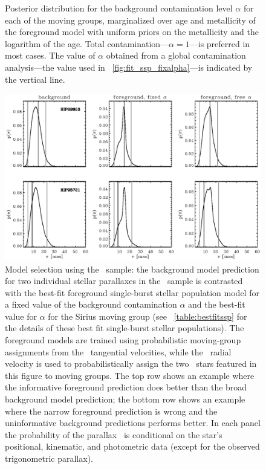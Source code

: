 \begin{figure}
\begin{center}
\caption[Posterior distribution for the background contamination level
$\alpha$ for each of the moving groups, marginalized over age and
metallicity of the foreground model]{Posterior distribution for the
background contamination level $\alpha$ for each of the moving groups,
marginalized over age and metallicity of the foreground model with
uniform priors on the metallicity and the logarithm of the age. Total
contamination---$\alpha=1$---is preferred in most cases. The value of
$\alpha$ obtained from a global contamination analysis---the value
used in \figurename~\ref{fig:fit_ssp_fixalpha}---is indicated by the
vertical line.}\label{fig:fit_ssp_alpha}
\end{center}
\end{figure}


\clearpage
\begin{figure}
\begin{center}
\includegraphics[width=\textwidth]{figs_groups/predict_plx_foreground_sirius.eps}
\caption[Model selection using the \gcsabb\ sample]{Model selection
  using the \gcsabb\ sample: the background model prediction for two
  individual stellar parallaxes in the \gcsabb\ sample is contrasted
  with the best-fit foreground single-burst stellar population model
  for a fixed value of the background contamination $\alpha$ and the
  best-fit value for $\alpha$ for the Sirius moving group (see
  \tablename~\ref{table:bestfitssp} for the details of these best fit
  single-burst stellar populations). The foreground models are trained
  using probabilistic moving-group assignments from the \Hipparcos\
  tangential velocities, while the \gcsabb\ radial velocity is used to
  probabilistically assign the two \gcsabb\ stars featured in this
  figure to moving groups. The top row shows an example where the
  informative foreground prediction does better than the broad
  background model prediction; the bottom row shows an example where
  the narrow foreground prediction is wrong and the uninformative
  background predictions performs better. In each panel the
  probability of the parallax \parallax\ is conditional on the star's
  positional, kinematic, and photometric data (except for the observed
  trigonometric
  parallax).}\label{fig:foreground_background_contrast_example}
\end{center}
\end{figure}


